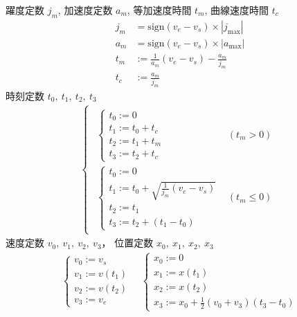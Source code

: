 \documentclass[a5paper]{ltjsarticle}
\begin{document}
躍度定数 $j_m$,
加速度定数 $a_m$,
等加速度時間 $t_m$,
曲線速度時間 $t_c$
\begin{align}
    j_m & = \mathrm{sign}(v_e-v_s) \times|j_{\max}|     \\
    a_m & = \mathrm{sign}(v_e-v_s) \times|a_{\max}|     \\
    t_m & := \frac{1}{a_m}(v_e - v_s) - \frac{a_m}{j_m} \\
    t_c & := \frac{a_m}{j_m}
\end{align}
時刻定数 $t_0,~t_1,~t_2,~t_3$
\begin{align}
    \left\{ \begin{array}{l}
        \begin{array}{ll}
            \left\{ \begin{array}{l}
                t_0 := 0         \\
                t_1 := t_0 + t_c \\
                t_2 := t_1 + t_m \\
                t_3 := t_2 + t_c
            \end{array} \right.
             &
            (t_m > 0)
            \\
            \left\{ \begin{array}{l}
                t_0 := 0                                   \\
                t_1 := t_0 + \sqrt{\frac{1}{j_m}(v_e-v_s)} \\
                t_2 := t_1                                 \\
                t_3 := t_2 + (t_1-t_0)
            \end{array} \right.
             &
            (t_m \le 0)
        \end{array}
    \end{array} \right.
\end{align}
速度定数 $v_0,~v_1,~v_2,~v_3$，
位置定数 $x_0,~x_1,~x_2,~x_3$
\begin{align}
    \left\{ \begin{array}{l}
        v_0 := v_s    \\
        v_1 := v(t_1) \\
        v_2 := v(t_2) \\
        v_3 := v_e
    \end{array} \right.
    \quad
    \left\{ \begin{array}{l}
        x_0 := 0      \\
        x_1 := x(t_1) \\
        x_2 := x(t_2) \\
        x_3 := x_0 + \frac{1}{2}(v_0 + v_3)(t_3-t_0)
    \end{array} \right.
\end{align}
\end{document}
